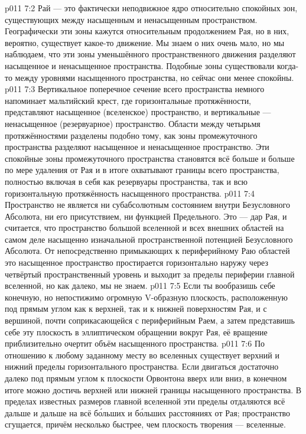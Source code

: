 \vs p011 7:2 Рай --- это фактически неподвижное ядро относительно спокойных зон, существующих между насыщенным и ненасыщенным пространством. Географически эти зоны кажутся относительным продолжением Рая, но в них, вероятно, существует какое\hyp{}то движение. Мы знаем о них очень мало, но мы наблюдаем, что эти зоны уменьшённого пространственного движения разделяют насыщенное и ненасыщенное пространства. Подобные зоны существовали когда\hyp{}то между уровнями насыщенного пространства, но сейчас они менее спокойны.
\vs p011 7:3 Вертикальное поперечное сечение всего пространства немного напоминает мальтийский крест, где горизонтальные протяжённости, представляют насыщенное (вселенское) пространство, и вертикальные --- ненасыщенное (резервуарное) пространство. Области между четырьмя протяжённостями разделены подобно тому, как зоны промежуточного пространства разделяют насыщенное и ненасыщенное пространство. Эти спокойные зоны промежуточного пространства становятся всё больше и больше по мере удаления от Рая и в итоге охватывают границы всего пространства, полностью включая в себя как резервуары пространства, так и всю горизонтальную протяжённость насыщенного пространства.
\vs p011 7:4 \pc Пространство не является ни субабсолютным состоянием внутри Безусловного Абсолюта, ни его присутствием, ни функцией Предельного. Это --- дар Рая, и считается, что пространство большой вселенной и всех внешних областей на самом деле насыщенно изначальной пространственной потенцией Безусловного Абсолюта. От непосредственно примыкающих к периферийному Раю областей это насыщенное пространство простирается горизонтально наружу через четвёртый пространственный уровень и выходит за пределы периферии главной вселенной, но как далеко, мы не знаем.
\vs p011 7:5 Если ты вообразишь себе конечную, но непостижимо огромную V\hyp{}образную плоскость, расположенную под прямым углом как к верхней, так и к нижней поверхностям Рая, и с вершиной, почти соприкасающейся с периферийным Раем, а затем представишь себе эту плоскость в эллиптическом обращении вокруг Рая, её вращение приблизительно очертит объём насыщенного пространства.
\vs p011 7:6 По отношению к любому заданному месту во вселенных существует верхний и нижний пределы горизонтального пространства. Если двигаться достаточно далеко под прямым углом к плоскости Орвонтона вверх или вниз, в конечном итоге можно достичь верхней или нижней границы насыщенного пространства. В пределах известных размеров главной вселенной эти пределы отдаляются всё дальше и дальше на всё б\'ольших и б\'ольших расстояниях от Рая; пространство сгущается, причём несколько быстрее, чем плоскость творения --- вселенные.
